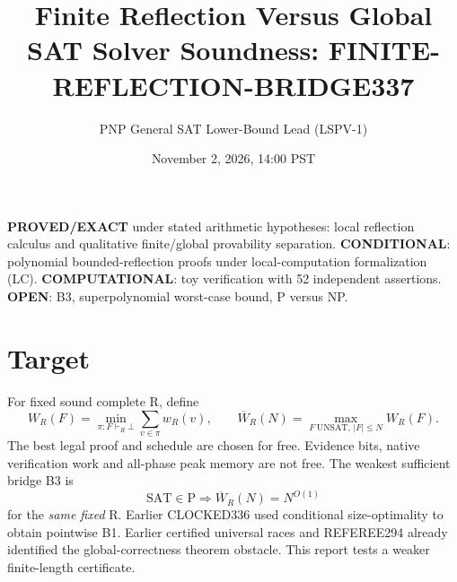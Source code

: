 \documentclass[11pt]{article}
\title{Finite Reflection Versus Global SAT Solver Soundness: FINITE-REFLECTION-BRIDGE337}
\author{PNP General SAT Lower-Bound Lead (LSPV-1)}
\date{November 2, 2026, 14:00 PST}
\begin{document}
\maketitle
\noindent \textbf{PROVED/EXACT} under stated arithmetic hypotheses: local reflection calculus and qualitative finite/global provability separation. \textbf{CONDITIONAL}: polynomial bounded-reflection proofs under local-computation formalization (LC). \textbf{COMPUTATIONAL}: toy verification with 52 independent assertions. \textbf{OPEN}: B3, superpolynomial worst-case bound, P versus NP.
\section{Target}
For fixed sound complete R, define
\[
W_R(F)=\min_{\pi:F\vdash_R\bot}\sum_{v\in\pi}w_R(v),\qquad
\overline W_R(N)=\max_{F\mathrm{\ UNSAT},\,|F|\le N}W_R(F).
\]
The best legal proof and schedule are chosen for free. Evidence bits, native verification work and all-phase peak memory are not free. The weakest sufficient bridge B3 is
\[
\mathrm{SAT}\in\mathrm P\Longrightarrow\overline W_R(N)=N^{O(1)}
\]
for the \emph{same fixed} R. Earlier CLOCKED336 used conditional size-optimality to obtain pointwise B1. Earlier certified universal races and REFEREE294 already identified the global-correctness theorem obstacle. This report tests a weaker finite-length certificate.
\end{document}
